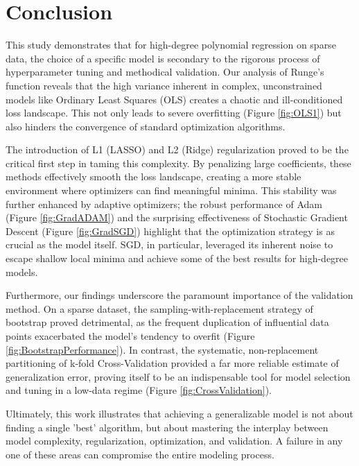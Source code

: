 \documentclass[twocolumn,aps]{revtex4}
\begin{document}
\section{Conclusion}\label{section:conclusion} 

This study demonstrates that for high-degree polynomial regression on sparse data, the choice of a specific model is secondary to the rigorous process of hyperparameter tuning and methodical validation. Our analysis of Runge's function reveals that the high variance inherent in complex, unconstrained models like Ordinary Least Squares (OLS) creates a chaotic and ill-conditioned loss landscape. This not only leads to severe overfitting (Figure \ref{fig:OLS1}) but also hinders the convergence of standard optimization algorithms.

The introduction of L1 (LASSO) and L2 (Ridge) regularization proved to be the critical first step in taming this complexity. By penalizing large coefficients, these methods effectively smooth the loss landscape, creating a more stable environment where optimizers can find meaningful minima. This stability was further enhanced by adaptive optimizers; the robust performance of Adam (Figure \ref{fig:GradADAM}) and the surprising effectiveness of Stochastic Gradient Descent (Figure \ref{fig:GradSGD}) highlight that the optimization strategy is as crucial as the model itself. SGD, in particular, leveraged its inherent noise to escape shallow local minima and achieve some of the best results for high-degree models.

Furthermore, our findings underscore the paramount importance of the validation method. On a sparse dataset, the sampling-with-replacement strategy of bootstrap proved detrimental, as the frequent duplication of influential data points exacerbated the model's tendency to overfit (Figure \ref{fig:BootstrapPerformance}). In contrast, the systematic, non-replacement partitioning of k-fold Cross-Validation provided a far more reliable estimate of generalization error, proving itself to be an indispensable tool for model selection and tuning in a low-data regime (Figure \ref{fig:CrossValidation}).

Ultimately, this work illustrates that achieving a generalizable model is not about finding a single 'best' algorithm, but about mastering the interplay between model complexity, regularization, optimization, and validation. A failure in any one of these areas can compromise the entire modeling process.



\end{document}
